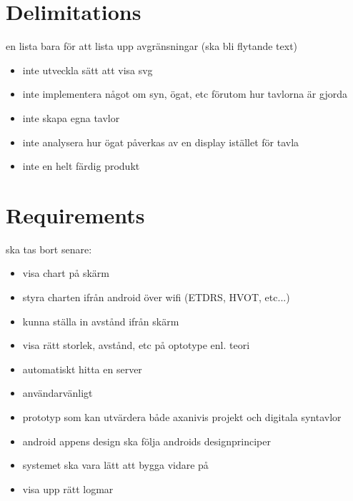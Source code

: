 \documentclass[12pt,a4paper,notitlepage]{report}
\begin{document}



\section{Delimitations}
en lista bara för att lista upp avgränsningar (ska bli flytande text)
\begin{itemize}
\item inte utveckla sätt att visa svg
\item inte implementera något om syn, ögat, etc förutom hur tavlorna är gjorda
\item inte skapa egna tavlor
\item inte analysera hur ögat påverkas av en display istället för tavla
\item inte en helt färdig produkt
\end{itemize}


\section{Requirements}
ska tas bort senare:
\begin{itemize}
\item visa chart på skärm
\item styra charten ifrån android över wifi (ETDRS, HVOT, etc...)
\item kunna ställa in avstånd ifrån skärm
\item visa rätt storlek, avstånd, etc på optotype enl. teori
\item automatiskt hitta en server
\item användarvänligt
\item prototyp som kan utvärdera både axanivis projekt och digitala syntavlor
\item android appens design ska följa androids designprinciper
\item systemet ska vara lätt att bygga vidare på
\item visa upp rätt logmar
\end{itemize}
\end{document}
